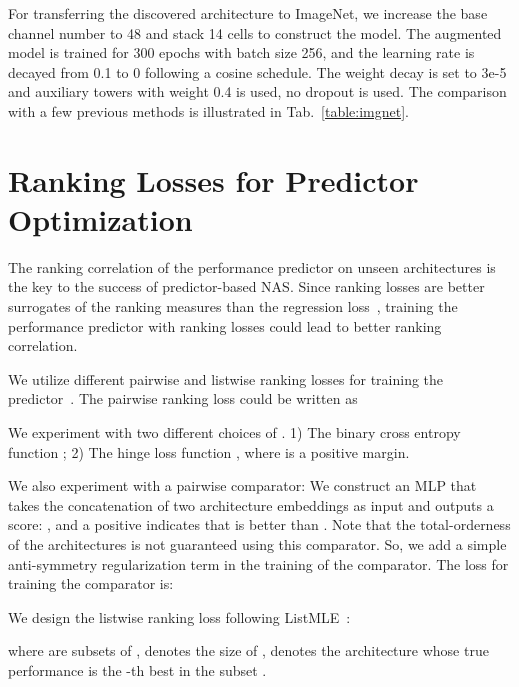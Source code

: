 \documentclass[runningheads]{llncs}
\begin{document}
For transferring the discovered architecture to ImageNet, we increase the base channel number to 48 and stack 14 cells to construct the model. The augmented model is trained for 300 epochs with batch size 256, and the learning rate is decayed from 0.1 to 0 following a cosine schedule. The weight decay is set to 3e-5 and auxiliary towers with weight 0.4 is used, no dropout is used. The comparison with a few previous methods is illustrated in Tab.~\ref{table:imgnet}.



\section{Ranking Losses for Predictor Optimization}

The ranking correlation of the performance predictor on unseen architectures is the key to the success of predictor-based NAS. 
Since ranking losses are better surrogates of the ranking measures than the regression loss~\cite{chen2009}, training the performance predictor with ranking losses could lead to better ranking correlation.

We utilize different pairwise and listwise ranking losses for training the predictor~\cite{burges2005learning,shashua2003ranking,xia2008listwise}. The pairwise ranking loss could be written as



We experiment with two different choices of . 1) The binary cross entropy function ; 
2) The hinge loss function , where  is a positive margin.

We also experiment with a pairwise comparator: We construct an MLP that takes the concatenation of two architecture embeddings as input and outputs a score: , and a positive  indicates that  is better than .  Note that the total-orderness of the architectures is not guaranteed using this comparator. So, we add a simple anti-symmetry regularization term in the training of the comparator. The loss for training the comparator is:



We design the listwise ranking loss following ListMLE~\cite{xia2008listwise}:

where  are subsets of ,  denotes the size of ,  denotes the architecture whose true performance  is the -th best in the subset .
\end{document}
